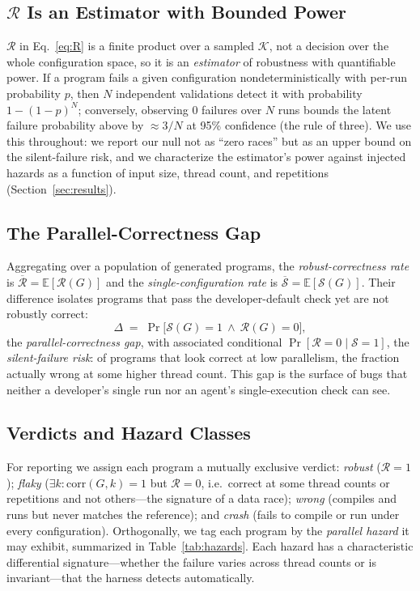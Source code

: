 \subsection{$\mathcal{R}$ Is an Estimator with Bounded Power}
$\mathcal{R}$ in Eq.~\ref{eq:R} is a finite product over a sampled
$\mathcal{K}$, not a decision over the whole configuration space, so it is an
\emph{estimator} of robustness with quantifiable power. If a program fails a given
configuration nondeterministically with per-run probability $p$, then $N$
independent validations detect it with probability $1-(1-p)^N$; conversely,
observing $0$ failures over $N$ runs bounds the latent failure probability above by
$\approx 3/N$ at 95\% confidence (the rule of three). We use this throughout:
we report our null not as ``zero races'' but as an upper bound on the
silent-failure risk, and we characterize the estimator's power against injected
hazards as a function of input size, thread count, and repetitions
(Section~\ref{sec:results}).

\subsection{The Parallel-Correctness Gap}
Aggregating over a population of generated programs, the \emph{robust-correctness
rate} is $\overline{\mathcal{R}}=\mathbb{E}[\mathcal{R}(G)]$ and the
\emph{single-configuration rate} is $\overline{\mathcal{S}}=\mathbb{E}[\mathcal{S}(G)]$.
Their difference isolates programs that pass the developer-default check yet are
not robustly correct:
\begin{equation}\label{eq:delta}
\Delta \;=\; \Pr\!\big[\mathcal{S}(G){=}1 \ \wedge\ \mathcal{R}(G){=}0\big],
\end{equation}
the \emph{parallel-correctness gap}, with associated conditional
$\Pr[\mathcal{R}{=}0\mid\mathcal{S}{=}1]$, the \emph{silent-failure risk}: of
programs that look correct at low parallelism, the fraction actually wrong at some
higher thread count. This gap is the surface of bugs that neither a developer's
single run nor an agent's single-execution check can see.

\subsection{Verdicts and Hazard Classes}
For reporting we assign each program a mutually exclusive verdict:
\emph{robust} ($\mathcal{R}{=}1$); \emph{flaky}
($\exists k:\mathrm{corr}(G,k){=}1$ but $\mathcal{R}{=}0$, i.e.\ correct at some
thread counts or repetitions and not others---the signature of a data race);
\emph{wrong} (compiles and runs but never matches the reference); and
\emph{crash} (fails to compile or run under every configuration). Orthogonally,
we tag each program by the \emph{parallel hazard} it may exhibit, summarized in
Table~\ref{tab:hazards}. Each hazard has a characteristic differential
signature---whether the failure varies across thread counts or is invariant---that
the harness detects automatically.


